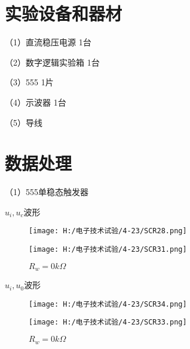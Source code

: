 \documentclass{article}
\begin{document}
\section{ 实验设备和器材}
（1）直流稳压电源              \qquad \quad \qquad \qquad \qquad \qquad           1台\par
（2）数字逻辑实验箱            \qquad  \qquad \qquad \qquad\qquad                1台\par
（3）555             \qquad   \qquad     \qquad \qquad \qquad \qquad \qquad \qquad     1片\par
（4）示波器                   \qquad  \qquad \qquad \qquad\qquad  \qquad  \qquad    1台\par
（5）导线   
\section{ 数据处理}
（1）555单稳态触发器\par
$u_i,u_c$波形
\begin{figure}[h]
    \begin{minipage}[t]{0.5\linewidth} %
      \centering   
      \texttt{[image: H:/电子技术试验/4-23/SCR28.png]}   
      \caption{$R_w=116.2k\Omega$}   
      \label{fig:side:a}   
    \end{minipage}%
    \begin{minipage}[t]{0.5\linewidth}   
      \centering   
      \texttt{[image: H:/电子技术试验/4-23/SCR31.png]}   
      \caption{$R_w=0k\Omega$}   
      \label{fig:side:b}   
    \end{minipage}   
  \end{figure}
  $u_i,u_0$波形
  \begin{figure}[h]
    \begin{minipage}[t]{0.5\linewidth} %
      \centering   
      \texttt{[image: H:/电子技术试验/4-23/SCR34.png]}   
      \caption{$R_w=116.2k\Omega$}   
      \label{fig:side:a}   
    \end{minipage}%
    \begin{minipage}[t]{0.5\linewidth}   
      \centering   
      \texttt{[image: H:/电子技术试验/4-23/SCR33.png]}   
      \caption{$R_w=0k\Omega$}   
      \label{fig:side:b}   
    \end{minipage}   
  \end{figure}
\end{document}
